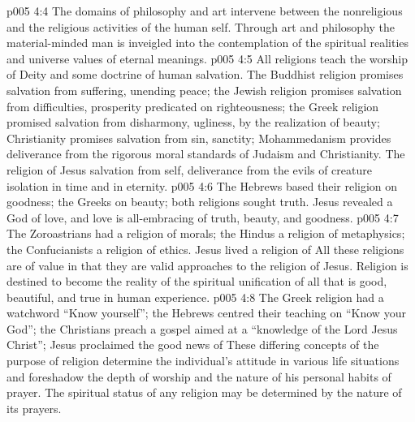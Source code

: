 \vs p005 4:4 \pc The domains of philosophy and art intervene between the nonreligious and the religious activities of the human self. Through art and philosophy the material\hyp{}minded man is inveigled into the contemplation of the spiritual realities and universe values of eternal meanings.
\vs p005 4:5 \pc All religions teach the worship of Deity and some doctrine of human salvation. The Buddhist religion promises salvation from suffering, unending peace; the Jewish religion promises salvation from difficulties, prosperity predicated on righteousness; the Greek religion promised salvation from disharmony, ugliness, by the realization of beauty; Christianity promises salvation from sin, sanctity; Mohammedanism provides deliverance from the rigorous moral standards of Judaism and Christianity. The religion of Jesus  salvation from self, deliverance from the evils of creature isolation in time and in eternity.
\vs p005 4:6 The Hebrews based their religion on goodness; the Greeks on beauty; both religions sought truth. Jesus revealed a God of love, and love is all\hyp{}embracing of truth, beauty, and goodness.
\vs p005 4:7 The Zoroastrians had a religion of morals; the Hindus a religion of metaphysics; the Confucianists a religion of ethics. Jesus lived a religion of  All these religions are of value in that they are valid approaches to the religion of Jesus. Religion is destined to become the reality of the spiritual unification of all that is good, beautiful, and true in human experience.
\vs p005 4:8 The Greek religion had a watchword “Know yourself”; the Hebrews centred their teaching on “Know your God”; the Christians preach a gospel aimed at a “knowledge of the Lord Jesus Christ”; Jesus proclaimed the good news of  These differing concepts of the purpose of religion determine the individual’s attitude in various life situations and foreshadow the depth of worship and the nature of his personal habits of prayer. The spiritual status of any religion may be determined by the nature of its prayers.
